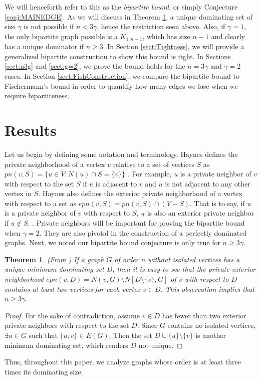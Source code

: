 \documentclass[12pt]{amsart}
\newtheorem{thm}{Theorem}
\begin{document}
We will henceforth refer to this as the \textit{bipartite bound}, or simply Conjecture \ref{conj:MAINEDGE}. As we will discuss in Theorem \ref{thm:2privateneighbs}, a unique dominating set of size $\gamma$ is not possible if $n <3\gamma$, hence the restriction seen above. Also, if $\gamma = 1$, the only bipartite graph possible is a $K_{1,n-1}$, which has size $n-1$ and clearly has a unique dominator if $n \geq 3$. In Section \ref{sect:Tightness}, we will provide a generalized bipartite construction to show this bound is tight. In Sections \ref{sect:n3g} and \ref{sect:g=2}, we prove the bound holds for the $n = 3\gamma$ and $\gamma = 2$ cases. In Section \ref{sect:FishConstruction}, we compare the bipartite bound to Fischermann's bound in order to quantify how many edges we lose when we require bipartiteness.
\section{Results}\label{sect:Results}
Let us begin by defining some notation and terminology. Haynes defines the private neighborhood of a vertex $v$ relative to a set of vertices $S$ as $pn(v, S) = \{u \in V : N(u) \cap S = \{v\}\}$ \cite{EPN}. For example, $u$ is a private neighbor of $v$ with respect to the set $S$ if $u$ is adjacent to $v$ and $u$ is not adjacent to any other vertex in $S$. Haynes also defines the exterior private neighborhood of a vertex with respect to a set as $epn(v, S) = pn(v, S) \cap (V - S)$. That is to say, if $u$ is a private neighbor of $v$ with respect to $S$, $u$ is also an exterior private neighbor if $u \notin S$. \cite{Roman_Dom}. Private neighbors will be important for proving the bipartite bound when $\gamma = 2$. They are also pivotal in the construction of a perfectly dominated graphs.
Next, we noted our bipartite bound conjecture is only true for $n \geq 3\gamma$. 
\begin{thm}\label{thm:2privateneighbs}
(From \cite{Original_Paper}) If a graph $G$ of order $n$ without isolated vertices has a unique minimum dominating
set $D$, then it is easy to see that the private exterior neighborhood $epn(v, D) = N(v, G)\setminus N[D\setminus\{v\}, G]$ of $v$ with respect to $D$ contains at least two vertices for each vertex $v \in D$. This observation implies that $n \geq 3\gamma$.
\end{thm}
\begin{proof}
    For the sake of contradiction, assume $v\in D$ has fewer than two exterior private neighbors with respect to the set $D$. Since $G$ contains no isolated vertices, $\exists u \in G$ such that $\{u,v\} \in E(G)$. Then the set $D \cup \{u\} \setminus \{v\}$ is another minimum dominating set, which renders $D$ not unique.
\end{proof}
Thus, throughout this paper, we analyze graphs whose order is at least three times its dominating size.
\end{document}
